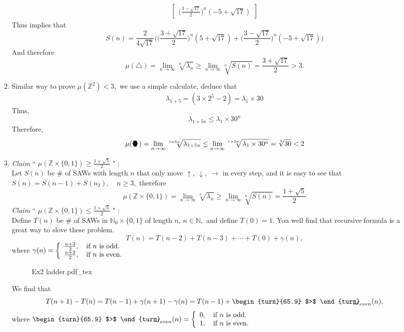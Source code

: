 \documentclass[12pt,a4paper]{report}
\theoremstyle{definition}
\newcommand{\sixedge}{\mbox{\parbox[t][-2pt][c]{10pt}{\scriptsize$\blacktriangledown\hspace{-3.6pt}\blacktriangle\hspace{-4pt}\blacktriangledown$}\hspace{-10.2pt}\parbox[b][10.7pt][c]{10pt}{\scriptsize$\blacktriangle\hspace{-3.6pt}\blacktriangledown\hspace{-3.6pt}\blacktriangle$}}}
\newcommand{\indecate}{\mbox{\begin{turn}{65.9}
$>$
\end{turn}\hspace{-10.5pt}\parbox[t][-5pt][c]{10pt}{$\bot$}\hspace{-4.35pt}\parbox[t][-3.4pt][c]{4pt}{$\shortmid$}}}
\newcommand{\incfig}[1]{%
{#1.pdf_tex}
}
\begin{document}
\begin{enumerate}
\begin{enumerate}
\begin{align*}
\begin{bmatrix}
    		\big(\frac{3-\sqrt{17}}{2}\big)^n(-5+\sqrt{17})
    		\end{bmatrix}
		\end{align*}
		Thus implies that
		\[
		S(n)=\frac{2}{4\sqrt{17}}\bigg(\Big(\frac{3+\sqrt{17}}{2}\Big)^n(5+\sqrt{17})+\Big(\frac{3-\sqrt{17}}{2}\Big)^n(-5+\sqrt{17})\bigg)
		\]
		And therefore
		\[
		\mu(\triangle)=\lim_{n\to\infty}\sqrt[n]{\lambda_n}\geq \lim_{n\to\infty}\sqrt[n]{S(n)}=\frac{3+\sqrt{17}}{2}>3.
		\]
		\item  Similar way to prove $\mu(\mathbb{Z}^2)<3,$ we use a simple calculate, deduce that 
		\[
		\lambda_{1+5}=(3\times 2^5-2)=\lambda_1\times 30
		\]
		Thus,
		\[
		\lambda_{1+5n}\leq \lambda_1\times 30^{n}
		\]
		Therefore,
		\[
		\mu(\sixedge)=\lim_{n\to\infty}\sqrt[1+5n]{\lambda_{1+5n}}\leq \lim_{n\to\infty}\sqrt[1+5n]{\lambda_1\times 30^n}=\sqrt[5]{30}<2
		\]
		\item \textit{Claim} `` $\mu(\mathbb{Z}\times\{0,1\})\geq \frac{1+\sqrt{5}}{2}$ " : \\
		Let $S(n)$ be \# of SAWs with length $n$ that only move $\uparrow,\ \downarrow,\ \rightarrow$ in every step, and it is easy to see that $S(n)=S(n-1)+S(n_2),\quad n\geq 3,$ therefore
		\[
		\mu(\mathbb{Z}\times\{0,1\})=\lim_{n\to\infty}\sqrt[n]{\lambda_n}\geq\lim_{n\to\infty}\sqrt[n]{S(n)}=\frac{1+\sqrt{5}}{2}
		\]
		\newpage
		\textit{Claim} `` $\mu(\mathbb{Z}\times\{0,1\})\leq\frac{1+\sqrt{5}}{2}$ " :\\
		Define $T(n)$ be \# of SAWs in $\mathbb{N}_0\times \{0,1\}$ of length $n$, $n\in \mathbb{N},$ and define $T(0)=1.$ You well find that recursive formula is a great way to slove these problem.
		\[
		T(n)=T(n-2)+T(n-3)+\cdots +T(0)+\gamma(n), 
		\]
		where $ \gamma(n)=\bigg\{\begin{array}[c]{l}
		\frac{n+3}{2},\quad \mbox{if } n \mbox{ is odd.}\\
		\frac{n+2}{2},\quad \mbox{if }n \mbox{ is even.}
		\end{array} $
		\begin{figure}[htp]
		\centering
		\def\svgwidth{10cm}
		\incfig{Ex2 ladder}
		\end{figure}
		We find that 
		\[
		T(n+1)-T(n)=T(n-1)+\gamma(n+1)-\gamma(n)=T(n-1)+\indecate_{even}(n),
		\]
		where $\indecate_{even}(n)=\bigg\{\begin{array}[c]{l}
		0,\quad \mbox{if } n \mbox{ is odd.}\\
		1,\quad \mbox{if }n \mbox{ is even.}
		\end{array}$\\[3pt]

\end{enumerate}
\end{enumerate}
\end{document}
